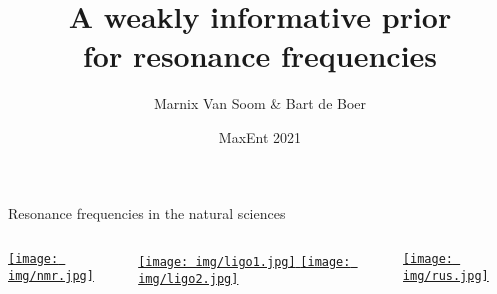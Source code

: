 \documentclass[10pt,xcolor={dvipsnames}]{beamer}
\title{A weakly informative prior\\for resonance frequencies}
\date{MaxEnt 2021}
\author{Marnix Van Soom \& Bart de Boer}
\begin{document}
\maketitle


\begin{frame}{Resonance frequencies in the natural sciences}
\pause
\begin{columns}
\begin{column}{.25\textwidth}
\href{https://en.wikipedia.org/wiki/Nuclear_magnetic_resonance_spectroscopy}{\texttt{[image: img/nmr.jpg]}}
\cite{Wilson2014a}
\pause
\end{column}
\begin{column}{.25\textwidth}
\href{https://en.wikipedia.org/wiki/LIGO}{%
\texttt{[image: img/ligo1.jpg]}
\texttt{[image: img/ligo2.jpg]}
}
\cite{Littenberg2015}
\pause
\end{column}
\begin{column}{.25\textwidth}
\href{https://acoustics.org/pressroom/httpdocs/158th/pestka.htm}{ \texttt{[image: img/rus.jpg]}}
\cite{Xu2019}
\end{column}
\end{columns}

\end{frame}
\end{document}
